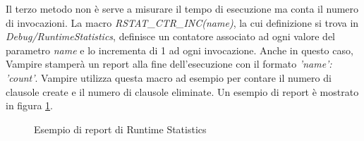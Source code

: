 \documentclass[./main.tex]{subfiles}
\begin{document}
Il terzo metodo non è serve a misurare il tempo di esecuzione ma conta il numero di invocazioni.
La macro \textit{RSTAT\_CTR\_INC(name)}, la cui definizione si trova in \textit{Debug/RuntimeStatistics}, definisce 
un contatore associato ad ogni valore del parametro \textit{name} e lo incrementa di 1 ad ogni invocazione.
Anche in questo caso, Vampire stamperà un report alla fine dell'esecuzione con il formato \textit{'name': 'count'}.
Vampire utilizza questa macro ad esempio per contare il numero di clausole create e il numero di clausole eliminate.
Un esempio di report è mostrato in figura \ref{fig:rstat_report}.

\begin{figure}[h]
    \centering
    \caption{Esempio di report di Runtime Statistics}
    \label{fig:rstat_report}
\end{figure}


  
\end{document}
